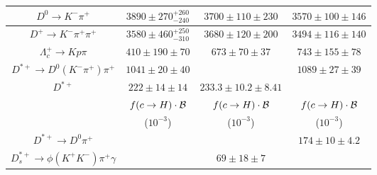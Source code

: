 {\begin{table}[hbpt]
\begin{tabular}{|c|c|c|c|}
$D^{0}\rightarrow K^-\pi^+  $      
                                   & $3890 \pm 270^{+260}_{-240}$\!\cite{Alexander:1996wy} 
                                   & $3700 \pm 110 \pm 230$\!\cite{Barate:1999bg} 
                                   & $3570 \pm 100 \pm 146$\!\cite{Abreu:1999vw} \\\hline
$D^{+}\rightarrow K^-\pi^+\pi^+  $ 
									& $3580 \pm 460^{+250}_{-310}$\!\cite{Alexander:1996wy} 
									& $3680 \pm 120 \pm 200$\!\cite{Barate:1999bg} 
									& $3494 \pm 116 \pm 140$\!\cite{Abreu:1999vw}\\ \hline
$\Lambda_c^+\rightarrow K p \pi$      
									& $410 \pm 190 \pm 70$\!\cite{Alexander:1996wy}
									& $673 \pm 70 \pm 37$\!\cite{Barate:1999bg} 
									& $743 \pm 155 \pm 78$\!\cite{Abreu:1999vw} \\\hline
$D^{*+}\rightarrow D^0(K^-\pi^+)\pi^+$  
									& $1041 \pm 20  \pm 40$\!\cite{Ackerstaff:1997ki}   
									&                                              
									&  $1089\pm 27\pm 39$\!\cite{Abreu:1999vw}\\\hline
%
$D^{*+} $                           
                                    & $222 \pm14  \pm14$\!\cite{Ackerstaff:1997ki}    
                                    &  $233.3\pm10.2\pm8.41$\!\cite{Barate:1999bg}            
                                    &  \\\hline\hline
                                    & $f(c\rightarrow H) \cdot {\cal B}$ & $f(c\rightarrow H) \cdot {\cal B}$ & $f(c\rightarrow H) \cdot {\cal B}$ \\
                                               & ($10^{-3}$) & ($10^{-3}$) & ($10^{-3}$) \\\hline\hline
$D^{*+} \rightarrow D^0\pi^+$      
                                     &     
                                     & 
                                     & $ 174\pm10\pm 4.2$\!\cite{Abreu:1999vx}  \\\hline
$D^{*+}_s\rightarrow \phi(K^+K^-)\pi^+\gamma$ 
                                     &  
                                     & $69 \pm 18 \pm 7$\cite{Barate:1999bg} 
                                     &  \\\hline


\end{tabular}
\end{table}}
